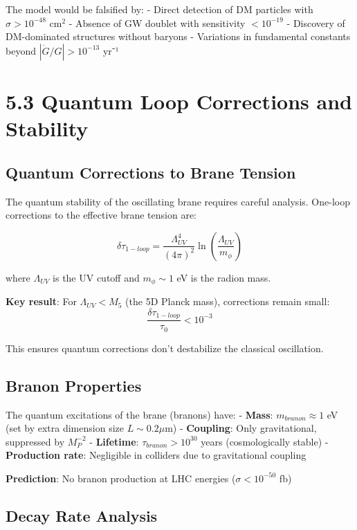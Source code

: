 \documentclass[
  11pt,
]{report}
\begin{document}
The model would be falsified by: - Direct detection of DM particles with
\(\sigma > 10^{-48}\) cm\(^2\) - Absence of GW doublet with sensitivity
\(< 10^{-19}\) - Discovery of DM-dominated structures without baryons -
Variations in fundamental constants beyond \(|\dot{G}/G| > 10^{-13}\)
yr⁻¹

\section{5.3 Quantum Loop Corrections and
Stability}\label{quantum-loop-corrections-and-stability}

\subsection{Quantum Corrections to Brane
Tension}\label{quantum-corrections-to-brane-tension}

The quantum stability of the oscillating brane requires careful
analysis. One-loop corrections to the effective brane tension are:

\[\delta\tau_{1-loop} = \frac{\Lambda_{UV}^4}{(4\pi)^2} \ln\left(\frac{\Lambda_{UV}}{m_\phi}\right)\]

where \(\Lambda_{UV}\) is the UV cutoff and \(m_\phi \sim 1\) eV is the
radion mass.

\textbf{Key result}: For \(\Lambda_{UV} < M_5\) (the 5D Planck mass),
corrections remain small:
\[\frac{\delta\tau_{1-loop}}{\tau_0} < 10^{-3}\]

This ensures quantum corrections don't destabilize the classical
oscillation.

\subsection{Branon Properties}\label{branon-properties}

The quantum excitations of the brane (branons) have: - \textbf{Mass}:
\(m_{branon} \approx 1\) eV (set by extra dimension size
\(L \sim 0.2 \mu\)m) - \textbf{Coupling}: Only gravitational, suppressed
by \(M_P^{-2}\) - \textbf{Lifetime}: \(\tau_{branon} > 10^{30}\) years
(cosmologically stable) - \textbf{Production rate}: Negligible in
colliders due to gravitational coupling

\textbf{Prediction}: No branon production at LHC energies
(\(\sigma < 10^{-50}\) fb)

\subsection{Decay Rate Analysis}\label{decay-rate-analysis}
\end{document}
